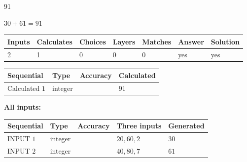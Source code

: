 \documentclass{ctexart}
\begin{document}
 

91
 
 
\noindent{}
 
 

 
 
 
\noindent{}
 
 

$ %
30 +  %
61=   %
91$
 
 
\noindent{}
 
 

 
   
   
   
   
\noindent\begin{tabular}{|l|l|l|l|l|l|l|}
 \hline
Inputs & Calculates & Choices & Layers & Matches & Answer & Solution \\ \hline
 2  & 
 1  & 
 0
  & 
 0  & 
 0  & 
  yes & 
  yes 
  \\ \hline
 \end{tabular}
   
   
   
   
\noindent{}
   
   
  
  
\noindent\begin{tabular}{|l|l|l|l|}
\hline
 Sequential & Type & Accuracy & Calculated \\ 
\hline
 
 
  Calculated $  1 $ & integer &  & 
  $ 91 $ 
 \\  \hline  
 \end{tabular}
   
   
   
   
\noindent\vspace{0.1in}\hspace{-0.08in} {\textbf{\Large{All inputs: }}}
   
   
  
  
\noindent\begin{tabular}{|l|l|l|l|l|}
\hline
 Sequential & Type & Accuracy & Three inputs & Generated \\ 
\hline
 
 
  INPUT $  1 $ & integer &  & $
 20
 , 
 60
 , 
 2
 $ & $ 30 $ 
 \\  \hline  
 
 
  INPUT $  2 $ & integer &  & $
 40
 , 
 80
 , 
 7
 $ & $ 61 $ 
 \\  \hline  
 \end{tabular}
   
\end{document}
